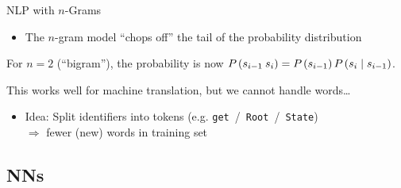 \begin{frame}{\acl{NLP} with $n$-Grams}
    \begin{itemize}
        \item

        The $n$-gram model \enquote{chops off} the tail of the probability distribution

    \end{itemize}

    \begin{example}
        For $n = 2$ (\enquote{bigram}), the probability is now $\P(s_{i-1}\:s_i) =
        \P(s_{i-1}) \P(s_i \mid s_{i-1})$.
    \end{example}

    \pause %

    \begin{m-problem}
        This works well for machine translation, but we cannot handle 
        words\ldots~\cite{Shi2022Splitting,Allamanis2015Suggesting}
    \end{m-problem}

    \begin{itemize}
        \item

        Idea: Split identifiers into tokens (e.g.\@
        \texttt{get}~\slash~\texttt{Root}~\slash~\texttt{State}) \\
        $\Longrightarrow$ fewer (new) words in training
        set~\cite{Shi2022Splitting,Karampatsis2020BPE,Allamanis2015Suggesting}

    \end{itemize}
\end{frame}


\subsection{\aclp{NN}}
\label{ssec:Survey-NN}

